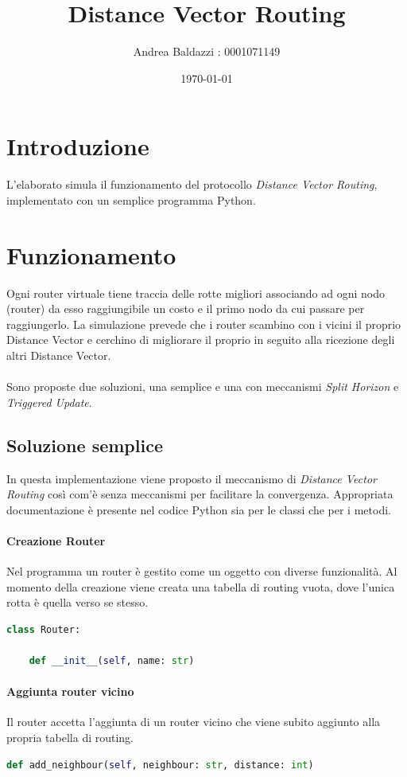 \documentclass{report}
\title{Distance Vector Routing}
\author{Andrea Baldazzi : 0001071149}
\date{\today}
\begin{document}
\maketitle

\tableofcontents

\chapter{Introduzione}
L'elaborato simula il funzionamento del protocollo \emph{Distance Vector Routing}, implementato con un semplice programma Python. 

\chapter{Funzionamento}
Ogni router virtuale tiene traccia delle rotte migliori associando ad ogni nodo (router) da esso raggiungibile un costo e il primo nodo da cui passare per raggiungerlo. La simulazione prevede che i router scambino con i vicini il proprio Distance Vector e cerchino di migliorare il proprio in seguito alla ricezione degli altri Distance Vector.
\\\\Sono proposte due soluzioni, una semplice e una con meccanismi \emph{Split Horizon} e \emph{Triggered Update}.

\section{Soluzione semplice}
In questa implementazione viene proposto il meccanismo di \emph{Distance Vector Routing} così com'è senza meccanismi per facilitare la convergenza. Appropriata documentazione è presente nel codice Python sia per le classi che per i metodi.
\subsubsection{Creazione Router}
Nel programma un router è gestito come un oggetto con diverse funzionalità. Al momento della creazione viene creata una tabella di routing vuota, dove l'unica rotta è quella verso se stesso.
\begin{lstlisting}[language=Python, caption=Creazione router]
class Router:

    def __init__(self, name: str)
\end{lstlisting}
\subsubsection{Aggiunta router vicino}
Il router accetta l'aggiunta di un router vicino che viene subito aggiunto alla propria tabella di routing.
\begin{lstlisting}[language=Python, caption=Aggiunta router vicino]
def add_neighbour(self, neighbour: str, distance: int)
\end{lstlisting}
\end{document}
